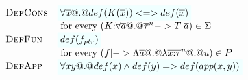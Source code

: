 \documentclass[preprint,nocopyrightspace]{sigplanconf}
\begin{document}
\[\begin{array}{lll} 
 \textsc{DefCons} & \formula{\forall \xs @.@ \definable{K(\xs)} <=> \definable{\xs}} \\
                        & \text{ for every } (K{:}\forall\as @.@ \oln{\tau}{n} -> T\;\as) \in \Sigma \\
 \textsc{DefFun}  & \formula{\definable{f_{ptr}}}  \\
                        & \text{ for every } (f |-> \Lambda\as @.@ \lambda\oln{x{:}\tau}{n} @.@ u) \in P \\
 \textsc{DefApp}  & \formula{\forall x y @.@ \definable{x}\land\definable{y} => \definable{app(x,y)}}

\end{array}\]
\end{document}
